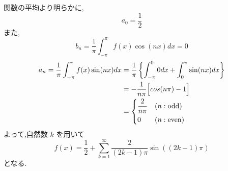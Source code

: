 \documentclass[uplatex,11pt,fleqn]{jsarticle}
\begin{document}
\noindent
\mbox{関数の平均より明らかに,}
\[
  a_0=\frac{1}{2}
\]
\mbox{また,}
\[
 b_n=\frac{1}{\pi}\int_{-\pi}^\pi f(x)\cos(nx)dx=0
\]
\begin{align}
 a_n=\frac{1}{\pi}\int_{-\pi}^\pi f(x)\sin(nx)dx
 &=\frac{1}{\pi} \left\{ \int_{-\pi}^0 0dx+\int_0^\pi \sin(nx)dx \right\} \nonumber \\
 &=-\frac{1}{n\pi} \Bigl[cos(n\pi)-1\Bigr] \nonumber \\ 
 &=\begin{dcases}
   \frac{2}{n\pi} & (n:\mbox{odd}) \nonumber \\
   0 & (n:\mbox{even})
 \end{dcases}
\end{align}
\mbox{よって,自然数} $ k $ \mbox{を用いて}
  \[
f(x)=\frac{1}{2}+\sum_{k=1}^{\infty}\frac{2}{(2k-1)\pi}\sin((2k-1)\pi)
\]
\mbox{となる.}
\end{document}
